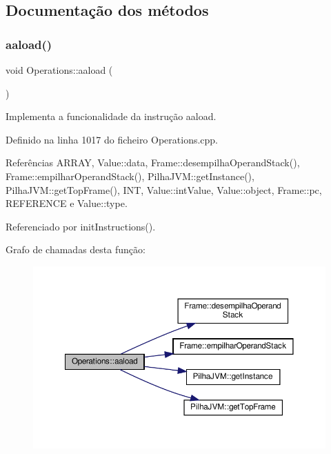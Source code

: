 \subsection{Documentação dos métodos}
\mbox{\label{classOperations_a522dfa2224d54268008f3bec4ff2b388}} 
\subsubsection{\texorpdfstring{aaload()}{aaload()}}
{\footnotesize\ttfamily void Operations\+::aaload (\begin{DoxyParamCaption}{ }\end{DoxyParamCaption})\hspace{0.3cm}{\ttfamily [private]}}



Implementa a funcionalidade da instrução aaload. 



Definido na linha 1017 do ficheiro Operations.\+cpp.



Referências A\+R\+R\+AY, Value\+::data, Frame\+::desempilha\+Operand\+Stack(), Frame\+::empilhar\+Operand\+Stack(), Pilha\+J\+V\+M\+::get\+Instance(), Pilha\+J\+V\+M\+::get\+Top\+Frame(), I\+NT, Value\+::int\+Value, Value\+::object, Frame\+::pc, R\+E\+F\+E\+R\+E\+N\+CE e Value\+::type.



Referenciado por init\+Instructions().

Grafo de chamadas desta função\+:
\nopagebreak
\begin{figure}[H]
\begin{center}
\leavevmode
\includegraphics[width=350pt]{classOperations_a522dfa2224d54268008f3bec4ff2b388_cgraph}
\end{center}
\end{figure}
\mbox{\label{classOperations_a60b30bd84b2d59334e735f0adda6febe}} 

